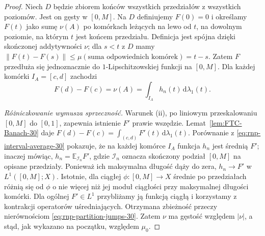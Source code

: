 \begin{proof}
Niech $D$ będzie zbiorem końców wszystkich
przedziałów z wszystkich poziomów. Jest on
gęsty w $[0,M]$. Na $D$ definiujemy $F(0)=0$
i określamy $F(t)$ jako sumę $\nu(A)$ po
komórkach leżących na lewo od $t$, na dowolnym
poziomie, na którym $t$ jest końcem przedziału.
Definicja jest spójna dzięki skończonej addytywności
$\nu$; dla $s<t$ z $D$ mamy
$\|F(t)-F(s)\|\le\mu(\text{suma odpowiednich komórek})
=t-s$. Zatem $F$ przedłuża się jednoznacznie
do $1$-Lipschitzowskiej funkcji na $[0,M]$.
Dla każdej komórki $I_A=[c,d]$ zachodzi
\begin{equation}\label{eq:rnp-interval-average-30}
 F(d)-F(c)=\nu(A)
 =\int_{I_A}h_n(t)\,\mathrm d\lambda_1(t).
\end{equation}

\emph{Różniczkowanie wymusza sprzeczność.}
Warunek (ii), po liniowym przeskalowaniu $[0,M]$
do $[0,1]$, zapewnia istnienie $F'$ prawie wszędzie.
Lemat~\ref{lem:FTC-Banach-30} daje
$F(d)-F(c)=\int_{(c,d)}F'(t)\,\mathrm d\lambda_1(t)$.
Porównanie z \eqref{eq:rnp-interval-average-30}
pokazuje, że na każdej komórce $I_A$ funkcja $h_n$
jest średnią $F'$; inaczej mówiąc,
$h_n=\mathbb E_{\mathcal I_n}F'$,
gdzie $\mathcal I_n$ oznacza skończony podział
$[0,M]$ na opisane przedziały.
Ponieważ ich maksymalna długość dąży do zera,
$h_n\to F'$ w $L^1([0,M];X)$. Istotnie, dla ciągłej
$\phi:[0,M]\to X$ średnie po przedziałach różnią się
od $\phi$ o nie więcej niż jej moduł ciągłości
przy maksymalnej długości komórki. Dla ogólnej
$F'\in L^1$ przybliżamy ją funkcją ciągłą i
korzystamy z kontrakcji operatorów uśredniających.
Otrzymana zbieżność przeczy nierównościom
\eqref{eq:rnp-partition-jumps-30}. Zatem $\nu$
ma gęstość względem $|\nu|$, a stąd, jak wykazano
na początku, względem $\mu_0$.
\end{proof}

